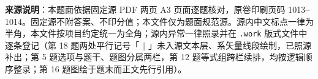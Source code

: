 


\begin{gktip}
\textbf{来源说明}：本题面依据固定源 PDF 两页 A3 页面逐题核对，原卷印刷页码 1013–1014。固定源不附答案、不印分值；本文件仅为题面规范源。源内中文标点一律为半角，本文件按项目约定统一为全角；源内异常一律照录并在 \texttt{.work} 版式文件中逐条登记（第 18 题两处平行记号「$\parallel$」未入源文本层、系矢量线段绘制，已照源补出；第 5 题选项与题干、题图分属两栏，第 12 题等式组跨栏续排，均按逻辑顺序整录；第 16 题图绘于题末而正文先行引用）。
\end{gktip}


